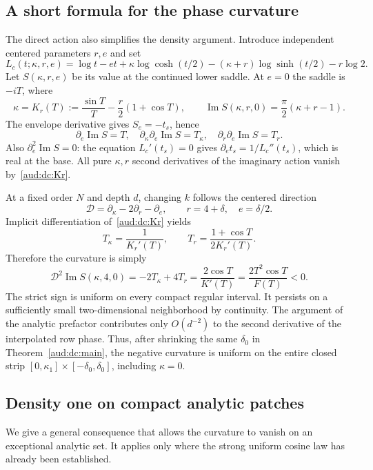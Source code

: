 \documentclass[11pt,a4paper]{article}
\numberwithin{equation}{section}
\begin{document}
\subsection{A short formula for the phase curvature}
The direct action also simplifies the density argument. Introduce independent centered parameters $r,e$ and set
\[
 L_c(t;\kappa,r,e)=\log t-et+\kappa\log\cosh(t/2)
                  -(\kappa+r)\log\sinh(t/2)-r\log2.
\]
Let $S(\kappa,r,e)$ be its value at the continued lower saddle. At $e=0$ the saddle is $-iT$, where
\begin{equation}\label{aud:dc:Kr}
 \kappa=K_r(T):=\frac{\sin T}{T}-\frac r2(1+\cos T),\qquad
 \operatorname{Im}S(\kappa,r,0)=\frac\pi2(\kappa+r-1).
\end{equation}
The envelope derivative gives $S_e=-t_s$, hence
\[
 \partial_e\operatorname{Im}S=T,\quad
 \partial_\kappa\partial_e\operatorname{Im}S=T_\kappa,\quad
 \partial_r\partial_e\operatorname{Im}S=T_r.
\]
Also $\partial_e^2\operatorname{Im}S=0$: the equation $L_c'(t_s)=0$ gives $\partial_e t_s=1/L_c''(t_s)$, which is real at the base. All pure $\kappa,r$ second derivatives of the imaginary action vanish by~\eqref{aud:dc:Kr}.

At a fixed order $N$ and depth $d$, changing $k$ follows the centered direction
\[
 \mathcal D=\partial_\kappa-2\partial_r-\partial_e,
 \qquad r=4+\delta,\quad e=\delta/2.
\]
Implicit differentiation of~\eqref{aud:dc:Kr} yields
\[
 T_\kappa=\frac1{K_r'(T)},\qquad
 T_r=\frac{1+\cos T}{2K_r'(T)}.
\]
Therefore the curvature is simply
\begin{equation}\label{aud:dc:curvature}
 \mathcal D^2\operatorname{Im}S(\kappa,4,0)
 =-2T_\kappa+4T_r
 =\frac{2\cos T}{K'(T)}
 =\frac{2T^2\cos T}{F(T)}<0.
\end{equation}
The strict sign is uniform on every compact regular interval. It persists on a sufficiently small two-dimensional neighborhood by continuity. The argument of the analytic prefactor contributes only $O(d^{-2})$ to the second derivative of the interpolated row phase. Thus, after shrinking the same $\delta_0$ in Theorem~\ref{aud:dc:main}, the negative curvature is uniform on the entire closed strip $[0,\kappa_1]\times[-\delta_0,\delta_0]$, including $\kappa=0$.

\subsection{Density one on compact analytic patches}
We give a general consequence that allows the curvature to vanish on an exceptional analytic set. It applies only where the strong uniform cosine law has already been established.
\end{document}
